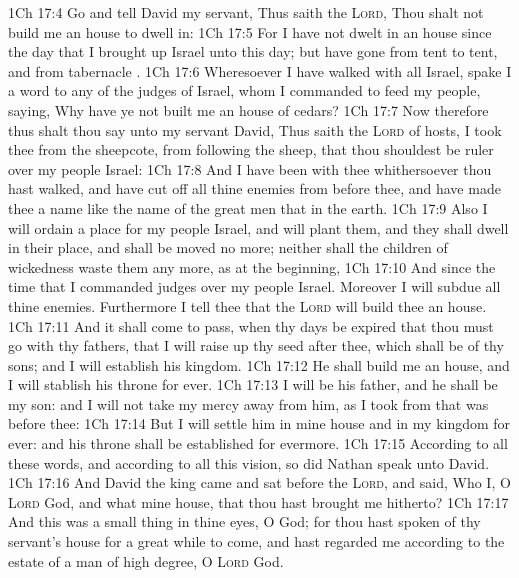 \vs 1Ch 17:4 Go and tell David my servant, Thus saith the \textsc{Lord}, Thou shalt not build me an house to dwell in:
\vs 1Ch 17:5 For I have not dwelt in an house since the day that I brought up Israel unto this day; but have gone from tent to tent, and from  tabernacle .
\vs 1Ch 17:6 Wheresoever I have walked with all Israel, spake I a word to any of the judges of Israel, whom I commanded to feed my people, saying, Why have ye not built me an house of cedars?
\vs 1Ch 17:7 Now therefore thus shalt thou say unto my servant David, Thus saith the \textsc{Lord} of hosts, I took thee from the sheepcote,  from following the sheep, that thou shouldest be ruler over my people Israel:
\vs 1Ch 17:8 And I have been with thee whithersoever thou hast walked, and have cut off all thine enemies from before thee, and have made thee a name like the name of the great men that  in the earth.
\vs 1Ch 17:9 Also I will ordain a place for my people Israel, and will plant them, and they shall dwell in their place, and shall be moved no more; neither shall the children of wickedness waste them any more, as at the beginning,
\vs 1Ch 17:10 And since the time that I commanded judges  over my people Israel. Moreover I will subdue all thine enemies. Furthermore I tell thee that the \textsc{Lord} will build thee an house.
\vs 1Ch 17:11 And it shall come to pass, when thy days be expired that thou must go  with thy fathers, that I will raise up thy seed after thee, which shall be of thy sons; and I will establish his kingdom.
\vs 1Ch 17:12 He shall build me an house, and I will stablish his throne for ever.
\vs 1Ch 17:13 I will be his father, and he shall be my son: and I will not take my mercy away from him, as I took  from  that was before thee:
\vs 1Ch 17:14 But I will settle him in mine house and in my kingdom for ever: and his throne shall be established for evermore.
\vs 1Ch 17:15 According to all these words, and according to all this vision, so did Nathan speak unto David.
\vs 1Ch 17:16 And David the king came and sat before the \textsc{Lord}, and said, Who  I, O \textsc{Lord} God, and what  mine house, that thou hast brought me hitherto?
\vs 1Ch 17:17 And  this was a small thing in thine eyes, O God; for thou hast  spoken of thy servant's house for a great while to come, and hast regarded me according to the estate of a man of high degree, O \textsc{Lord} God.
